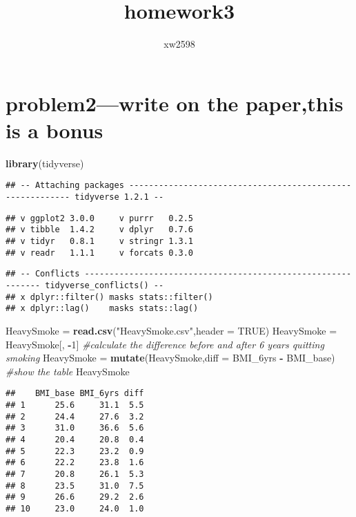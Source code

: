 \documentclass[]{article}
\title{homework3}
\author{xw2598}
\date{}
\newenvironment{Shaded}{\begin{snugshade}}{\end{snugshade}}
\newcommand{\KeywordTok}[1]{\textcolor[rgb]{0.13,0.29,0.53}{\textbf{#1}}}
\newcommand{\DataTypeTok}[1]{\textcolor[rgb]{0.13,0.29,0.53}{#1}}
\newcommand{\DecValTok}[1]{\textcolor[rgb]{0.00,0.00,0.81}{#1}}
\newcommand{\StringTok}[1]{\textcolor[rgb]{0.31,0.60,0.02}{#1}}
\newcommand{\CommentTok}[1]{\textcolor[rgb]{0.56,0.35,0.01}{\textit{#1}}}
\newcommand{\OtherTok}[1]{\textcolor[rgb]{0.56,0.35,0.01}{#1}}
\newcommand{\OperatorTok}[1]{\textcolor[rgb]{0.81,0.36,0.00}{\textbf{#1}}}
\newcommand{\NormalTok}[1]{#1}
\begin{document}
\maketitle

\section{problem2---write on the paper,this is a
bonus}\label{problem2write-on-the-paperthis-is-a-bonus}

\begin{Shaded}
\begin{Highlighting}[]
\KeywordTok{library}\NormalTok{(tidyverse)}
\end{Highlighting}
\end{Shaded}

\begin{verbatim}
## -- Attaching packages ---------------------------------------------------------- tidyverse 1.2.1 --
\end{verbatim}

\begin{verbatim}
## v ggplot2 3.0.0     v purrr   0.2.5
## v tibble  1.4.2     v dplyr   0.7.6
## v tidyr   0.8.1     v stringr 1.3.1
## v readr   1.1.1     v forcats 0.3.0
\end{verbatim}

\begin{verbatim}
## -- Conflicts ------------------------------------------------------------- tidyverse_conflicts() --
## x dplyr::filter() masks stats::filter()
## x dplyr::lag()    masks stats::lag()
\end{verbatim}

\begin{Shaded}
\begin{Highlighting}[]
\NormalTok{HeavySmoke =}\StringTok{ }\KeywordTok{read.csv}\NormalTok{(}\StringTok{"HeavySmoke.csv"}\NormalTok{,}\DataTypeTok{header =} \OtherTok{TRUE}\NormalTok{)}
\NormalTok{  HeavySmoke =}\StringTok{ }\NormalTok{HeavySmoke[, }\OperatorTok{-}\DecValTok{1}\NormalTok{] }
\CommentTok{#calculate the difference before and after 6 years quitting smoking}
\NormalTok{  HeavySmoke =}\StringTok{ }\KeywordTok{mutate}\NormalTok{(HeavySmoke,}\DataTypeTok{diff =}\NormalTok{ BMI_6yrs }\OperatorTok{-}\StringTok{ }\NormalTok{BMI_base)}
\CommentTok{#show the table }
\NormalTok{  HeavySmoke}
\end{Highlighting}
\end{Shaded}

\begin{verbatim}
##    BMI_base BMI_6yrs diff
## 1      25.6     31.1  5.5
## 2      24.4     27.6  3.2
## 3      31.0     36.6  5.6
## 4      20.4     20.8  0.4
## 5      22.3     23.2  0.9
## 6      22.2     23.8  1.6
## 7      20.8     26.1  5.3
## 8      23.5     31.0  7.5
## 9      26.6     29.2  2.6
## 10     23.0     24.0  1.0
\end{verbatim}
\end{document}

